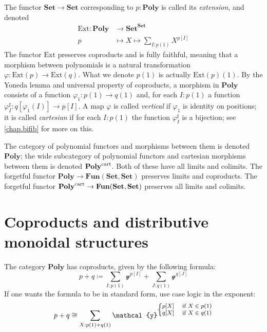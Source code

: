 \documentclass[11pt, one side, article]{memoir}
\theoremstyle{definition}
\theoremstyle{plain}
\newcommand{\Cat}[1]{\mathbf{#1}}%
\newcommand{\fun}[1]{\mathrm{#1}}%
\newcommand{\tn}[1]{\textnormal{#1}}
\newcommand{\smset}{\Cat{Set}}
\newcommand{\yon}{{\mathcal{y}}}
\newcommand{\poly}{\Cat{Poly}}
\newcommand{\polycart}{\poly^{\tn{cart}}}
\newcommand{\0}{\textsf{0}}
\newcommand{\1}{\tn{\textsf{1}}}
\newcommand{\ext}{\fun{Ext}}
\begin{document}
The functor $\smset\to\smset$ corresponding to $p:\poly$ is called its \emph{extension}, and denoted
\begin{align}
\ext\colon\poly&\to\smset^\smset\label{ext_functor}\\
p&\mapsto X\mapsto\sum_{I:p(1)}X^{p[I]}
\end{align} 
The functor $\ext$ preserves coproducts and is fully faithful, meaning that a morphism between polynomials is a natural transformation $\varphi\colon \ext(p)\to \ext(q)$. What we denote $p(1)$ is actually $\ext(p)(1)$. By the Yoneda lemma and universal property of coproducts, a morphism in $\poly$ consists of a function $\varphi_1\colon p(1)\to q(1)$ and, for each $I: p(1)$ a function $\varphi^\sharp_I\colon q[\varphi_1(I)]\to p[I]$. A map $\varphi$ is called \emph{vertical} if $\varphi_1$ is identity on positions; it is called \emph{cartesian} if for each $I: p(1)$ the function $\varphi_I^\sharp$ is a bijection; see \cref{chap.bifib} for more on this. 

The category of polynomial functors and morphisms between them is denoted $\poly$; the wide subcategory of polynomial functors and cartesian morphisms between them is denoted $\polycart$. Both of these have all limits and colimits. The forgetful functor $\poly\to\Cat{Fun}(\smset,\smset)$ preserves limits and coproducts. The forgetful functor $\polycart\to\Cat{Fun}(\smset,\smset)$ preserves all limits and colimits. 




\chapter{Coproducts and distributive monoidal structures}

The category $\poly$ has coproducts, given by the following formula:
\begin{equation}
p+q\coloneqq\sum_{I: p(1)}\yon^{p[I]}+\sum_{J: q(1)}\yon^{q[J]}
\end{equation}
If one wants the formula to be in standard form, use case logic in the exponent:
\begin{equation}
p+q\cong\sum_{X: p(1)+q(1)}\yon^{\fontsize{8pt}{8pt}\selectfont
	\begin{cases}
  	p[X]&\tn{ if }X\in p(1)\\
  	q[X]&\tn{ if }X\in q(1)
	\end{cases}\normalsize
	}
\end{equation}
\end{document}
